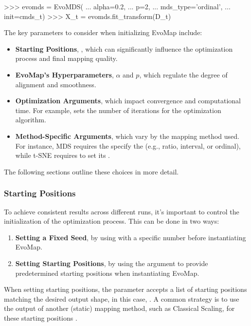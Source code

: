 \documentclass[article]{jss}
\begin{document}
\begin{Code}
>>> evomds = EvoMDS(
...     alpha=0.2, 
...     p=2, 
...     mds_type='ordinal', 
...     init=cmds_t)                  
>>> X_t = evomds.fit_transform(D_t)    
\end{Code}

The key parameters to consider when initializing EvoMap include:
\begin{itemize}
  \item \textbf{Starting Positions}, , which can significantly influence the optimization process and final %
  mapping quality. 
  \item \textbf{EvoMap's Hyperparameters}, $\alpha$ and $p$, which regulate the degree of alignment and smoothness.
  \item \textbf{Optimization Arguments}, which impact convergence and computational time. For example,  %
  sets the number of iterations for the optimization algorithm.  
  \item \textbf{Method-Specific Arguments}, which vary by the mapping method used. For instance, MDS requires the specify the  %
  (e.g., ratio, interval, or ordinal), while t-SNE requires to set its . 
\end{itemize}

The following sections outline these choices in more detail. 

\subsubsection{Starting Positions}

To achieve consistent results across different runs, it's important to control the initialization of the optimization 
process. This can be done in two ways:

\begin{enumerate}
    \item \textbf{Setting a Fixed Seed}, by using  with a specific number before instantiating EvoMap.
    \item \textbf{Setting Starting Positions}, by using the  argument to provide predetermined starting positions when %
    instantiating EvoMap.
\end{enumerate}

When setting starting positions, the  parameter accepts a list of starting positions matching
 the desired output shape, in this case, . A common strategy is to use the output of 
 another (static) mapping method, such as Classical Scaling, for these starting positions \citep{DeLeeuw+Mair:2009}.
\end{document}
